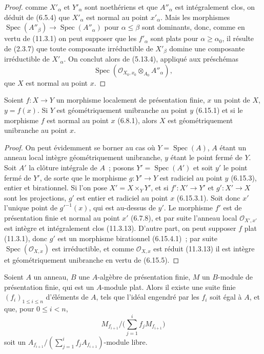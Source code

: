 \begin{proof}

comme $X'_\alpha$ et $Y'_\alpha$ sont noethériens et que $A''_\alpha$ est
intégralement clos, on déduit de (6.5.4) que $X'_\alpha$ est normal au point
$x'_\alpha$. Mais les morphismes
$\operatorname{Spec}(A''_\beta)\to\operatorname{Spec}(A''_\alpha)$ pour
$\alpha\leq\beta$ sont dominants, donc, comme en vertu de (11.3.1) on peut
supposer que les $f'_\alpha$ sont plats pour $\alpha\geq\alpha_0$, il résulte
de (2.3.7) que toute composante irréductible de $X'_\beta$ domine une
composante irréductible de $X'_\alpha$. On conclut alors de (5.13.4), appliqué
aux préschémas
\[
\operatorname{Spec}(\mathcal O_{X_0,x_0}\otimes_{A_0}A''_\alpha),
\]
que $X$ est normal au point $x$.
\end{proof}

\begin{corollary}[11.3.14]
\label{IV.11.3.14-fr}
Soient $f:X\to Y$ un morphisme localement de présentation finie, $x$ un point
de $X$, $y=f(x)$. Si $Y$ est géométriquement unibranche au point $y$ (6.15.1)
et si le morphisme $f$ est normal au point $x$ (6.8.1), alors $X$ est
géométriquement unibranche au point $x$.
\end{corollary}

\begin{proof}
On peut évidemment se borner au cas où $Y=\operatorname{Spec}(A)$, $A$ étant
un anneau local intègre géométriquement unibranche, $y$ étant le point fermé de
$Y$. Soit $A'$ la clôture intégrale de $A$~; posons
$Y'=\operatorname{Spec}(A')$ et soit $y'$ le point fermé de $Y'$, de sorte que
le morphisme $g:Y'\to Y$ est radiciel au point $y$ (6.15.3), entier et
birationnel. Si l'on pose $X'=X\times_Y Y'$, et si $f':X'\to Y'$ et
$g':X'\to X$ sont les projections, $g'$ est entier et radiciel au point $x$
(6.15.3.1). Soit donc $x'$ l'unique point de $g'^{-1}(x)$, qui est au-dessus
de $y'$. Le morphisme $f'$ est de présentation finie et normal au point $x'$
(6.7.8), et par suite l'anneau local $\mathcal O_{X',x'}$ est intègre et
intégralement clos (11.3.13). D'autre part, on peut supposer $f$ plat (11.3.1),
donc $g'$ est un morphisme birationnel (6.15.4.1)~; par suite
$\operatorname{Spec}(\mathcal O_{X,x})$ est irréductible, et comme
$\mathcal O_{X,x}$ est réduit (11.3.13) il est intègre et géométriquement
unibranche en vertu de (6.15.5).
\end{proof}

\begin{proposition}[11.3.15]
\label{IV.11.3.15-fr}
Soient $A$ un anneau, $B$ une $A$-algèbre de présentation finie, $M$ un
$B$-module de présentation finie, qui est un $A$-module plat. Alors il existe
une suite finie $(f_i)_{1\leq i\leq n}$ d'éléments de $A$, tels que l'idéal
engendré par les $f_i$ soit égal à $A$, et que, pour $0\leq i<n$,
\[
M_{f_{i+1}}\Big/\Big(\sum_{j=1}^{i}f_jM_{f_{i+1}}\Big)
\]
soit un
$A_{f_{i+1}}\big/(\sum_{j=1}^{i}f_jA_{f_{i+1}})$-module libre.
\end{proposition}

